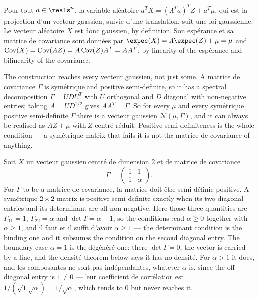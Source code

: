 \begin{remark}
Pour tout $a \in \reals^{n}$, la variable aléatoire
$a^{T}X = (A^{T}a)^{T}Z + a^{T}\mu$, qui est la projection d'un vecteur
gaussien, suivie d'une translation, suit une loi gaussienne. Le vecteur aléatoire
$X$ est donc gaussien, by definition. Son espérance et sa matrice de covariance
sont données par
$\expec(X) = A\expec(Z) + \mu = \mu$ and
$\operatorname{Cov}(X) = \operatorname{Cov}(AZ) = A\operatorname{Cov}(Z)A^{T} = AA^{T}$, by linearity of the espérance and
bilinearity of the covariance.
\end{remark}

\begin{remark}
The construction reaches every vecteur gaussien, not just some. A matrice de
covariance $\Gamma$ is symétrique and positive semi-definite, so it has a spectral
decomposition $\Gamma = UDU^{T}$ with $U$ orthogonal and $D$ diagonal with
non-negative entries; taking $A = UD^{1/2}$ gives $AA^{T} = \Gamma$. So for every
$\mu$ and every symétrique positive semi-definite $\Gamma$ there is a vecteur
gaussien $\mathcal{N}(\mu,\Gamma)$, and it can always be realised as $AZ + \mu$
with $Z$ centré réduit. Positive semi-definiteness is the whole condition --- a
symétrique matrix that fails it is not the matrice de covariance of anything.
\end{remark}

\begin{example}
Soit $X$ un vecteur gaussien centré de dimension $2$ et de matrice de covariance
\[
  \Gamma = \begin{pmatrix} 1 & 1 \\ 1 & \alpha \end{pmatrix} .
\]
For $\Gamma$ to be a matrice de covariance, la matrice doit être semi-définie
positive. A symétrique $2 \times 2$ matrix is positive semi-definite exactly when
its two diagonal entries and its determinant are all non-negative. Here those
three quantities are $\Gamma_{11} = 1$, $\Gamma_{22} = \alpha$ and
$\det\Gamma = \alpha - 1$, so the conditions read $\alpha \geq 0$ together with
$\alpha \geq 1$, and il faut et il suffit d'avoir $\alpha \geq 1$ --- the
determinant condition is the binding one and it subsumes the condition on the
second diagonal entry. The boundary case $\alpha = 1$ is the dégénéré
one: there $\det\Gamma = 0$, the vector is carried by a line, and the densité
theorem below says it has no densité. For $\alpha > 1$ it does, and les
composantes ne sont pas indépendantes, whatever $\alpha$ is, since the
off-diagonal entry is $1 \neq 0$ --- leur coefficient de corrélation est
$1/(\sqrt{1}\sqrt{\alpha}) = 1/\sqrt{\alpha}$, which tends to $0$ but never
reaches it.
\end{example}

